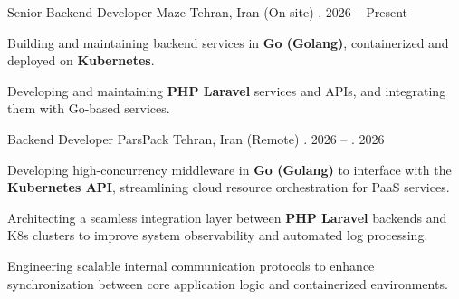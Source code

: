 

\begin{cventries}
\cventry
{Senior Backend Developer} %
{Maze} %
{Tehran, Iran (On-site)} %
{\shortmonthname[08]. 2026 -- Present} %
{
	\begin{cvitems}
		\item {Building and maintaining backend services in \textbf{Go (Golang)}, containerized and deployed on \textbf{Kubernetes}.}
		\item {Developing and maintaining \textbf{PHP Laravel} services and APIs, and integrating them with Go-based services.}
	\end{cvitems}
}

\cventry
{Backend Developer} %
{ParsPack} %
{Tehran, Iran (Remote)} %
{\shortmonthname[02]. 2026 -- \shortmonthname[08]. 2026} %
{
	\begin{cvitems}
		\item {Developing high-concurrency middleware in \textbf{Go (Golang)} to interface with the \textbf{Kubernetes API}, streamlining cloud resource orchestration for PaaS services.}
		\item {Architecting a seamless integration layer between \textbf{PHP Laravel} backends and K8s clusters to improve system observability and automated log processing.}
		\item {Engineering scalable internal communication protocols to enhance synchronization between core application logic and containerized environments.}
	\end{cvitems}
}


\end{cventries}
